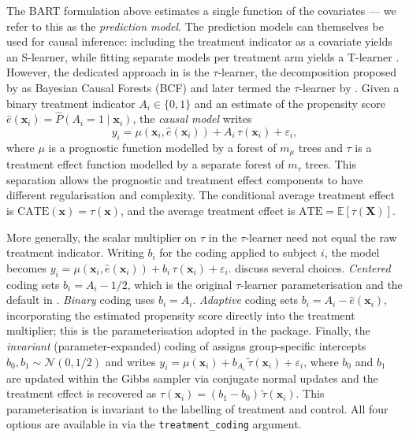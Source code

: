 The BART formulation above estimates a single function of the covariates --- we refer to this as the \emph{prediction model}. The prediction models can themselves be used for causal inference: including the treatment indicator as a covariate yields an S-learner, while fitting separate models per treatment arm yields a T-learner \citep{caron2022estimating}. However, the dedicated approach in  is the \(\tau\)-learner, the decomposition proposed by \citet{hahn2020bayesian} as Bayesian Causal Forests (BCF) and later termed the \(\tau\)-learner by \citet{caron2022estimating}. Given a binary treatment indicator \(A_i \in \{0, 1\}\) and an estimate of the propensity score \(\hat{e}(\mathbf{x}_i) = \hat{P}(A_i = 1 \mid \mathbf{x}_i)\), the \emph{causal model} writes
\[
y_i = \mu(\mathbf{x}_i, \hat{e}(\mathbf{x}_i)) + A_i\, \tau(\mathbf{x}_i) + \varepsilon_i,
\]
where \(\mu\) is a prognostic function modelled by a forest of \(m_\mu\) trees and \(\tau\) is a treatment effect function modelled by a separate forest of \(m_\tau\) trees. This separation allows the prognostic and treatment effect components to have different regularisation and complexity. The conditional average treatment effect is \(\text{CATE}(\mathbf{x}) = \tau(\mathbf{x})\), and the average treatment effect is \(\text{ATE} = \mathbb{E}[\tau(\mathbf{X})]\).

More generally, the scalar multiplier on \(\tau\) in the \(\tau\)-learner need not equal the raw treatment indicator. Writing \(b_i\) for the coding applied to subject \(i\), the model becomes \(y_i = \mu(\mathbf{x}_i, \hat{e}(\mathbf{x}_i)) + b_i\, \tau(\mathbf{x}_i) + \varepsilon_i\). \citet{hahn2020bayesian} discuss several choices. \emph{Centered} coding sets \(b_i = A_i - 1/2\), which is the original \(\tau\)-learner parameterisation and the default in . \emph{Binary} coding uses \(b_i = A_i\). \emph{Adaptive} coding sets \(b_i = A_i - \hat{e}(\mathbf{x}_i)\), incorporating the estimated propensity score directly into the treatment multiplier; this is the parameterisation adopted in the  package. Finally, the \emph{invariant} (parameter-expanded) coding of \citet[Section 5.2]{hahn2020bayesian} assigns group-specific intercepts \(b_0, b_1 \sim \mathcal{N}(0, 1/2)\) and writes \(y_i = \mu(\mathbf{x}_i) + b_{A_i}\, \tilde{\tau}(\mathbf{x}_i) + \varepsilon_i\), where \(b_0\) and \(b_1\) are updated within the Gibbs sampler via conjugate normal updates and the treatment effect is recovered as \(\tau(\mathbf{x}_i) = (b_1 - b_0)\, \tilde{\tau}(\mathbf{x}_i)\). This parameterisation is invariant to the labelling of treatment and control. All four options are available in  via the \texttt{treatment\_coding} argument.

